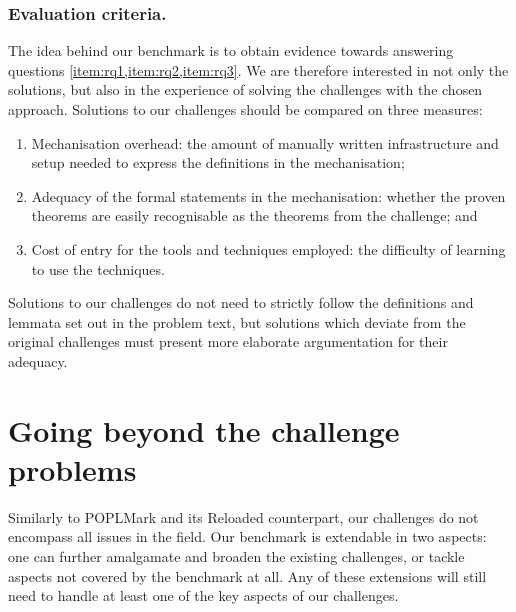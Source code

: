 \documentclass[runningheads]{llncs}
\begin{document}
\subsubsection{Evaluation criteria.}
The idea behind our benchmark is to obtain evidence towards answering questions \cref{item:rq1,item:rq2,item:rq3}. We are therefore interested in not only the solutions, but also in the experience of solving the challenges with the chosen approach.
Solutions to our challenges should be compared on three measures:
\begin{enumerate}
\item Mechanisation overhead: the amount of manually written infrastructure and setup needed to express the definitions in the mechanisation;
\item Adequacy of the formal statements in the mechanisation: whether the proven theorems are easily recognisable as the theorems from the challenge; and
\item Cost of entry for the tools and techniques employed: the difficulty of learning to use the techniques.
\end{enumerate}
Solutions to our challenges do not need to strictly follow the definitions and lemmata set out in the problem text, but solutions which deviate from the original challenges must present more elaborate argumentation for their adequacy.


\section{Going beyond the challenge problems}\label{sec:going-beyond}
Similarly to POPLMark and its Reloaded counterpart, our challenges do not encompass all issues in the field.
Our benchmark is extendable in two aspects: one can further amalgamate and broaden the existing challenges, or tackle aspects not covered by the benchmark at all.
Any of these extensions will still need to handle at least one of the key aspects of our challenges.
\end{document}

